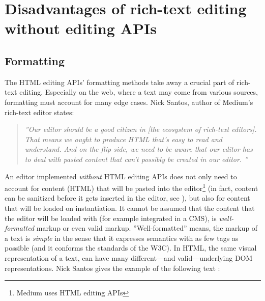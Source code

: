 
\section{Disadvantages of rich-text editing without editing APIs}

\subsection{Formatting}
\label{subsec:noapi_dis_formatting}
The HTML editing APIs' formatting methods take away a crucial part of rich-text editing. Especially on the web, where a text may come from various sources, formatting must account for many edge cases. Nick Santos, author of Medium's rich-text editor states:

\begin{quotation}
\textit{''Our editor should be a good citizen in [the ecosystem of rich-text editors]. That means we ought to produce HTML that's easy to read and understand. And on the flip side, we need to be aware that our editor has to deal with pasted content that can't possibly be created in our editor. \cite{medium_ce_terrible}''}
\end{quotation}


An editor implemented \textit{without} HTML editing APIs does not only need to account for content (HTML) that will be pasted into the editor\footnote{Medium uses HTML editing APIs} (in fact, content can be sanitized before it gets inserted in the editor, see ), but also for content that will be loaded on instantiation. It cannot be assumed that the content that the editor will be loaded with (for example integrated in a CMS), is \textit{well-formatted} markup or even valid markup. ''Well-formatted'' means, the markup of a text is \textit{simple} in the sense that it expresses semantics with as few tags as possible (and it conforms the standards  of the W3C). In HTML, the same visual representation of a text, can have many different---and valid---underlying DOM representations. Nick Santos gives the example of the following text \cite{medium_ce_terrible}:


